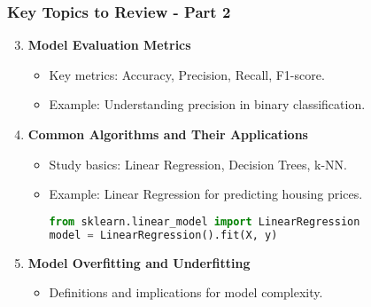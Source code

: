 \documentclass[aspectratio=169]{beamer}
\begin{document}
\begin{frame}[fragile]
    \frametitle{Key Topics to Review - Part 2}
    \begin{enumerate}
        \setcounter{enumi}{2} %
        \item \textbf{Model Evaluation Metrics}
        \begin{itemize}
            \item Key metrics: Accuracy, Precision, Recall, F1-score.
            \item Example: Understanding precision in binary classification.
        \end{itemize}

        \item \textbf{Common Algorithms and Their Applications}
        \begin{itemize}
            \item Study basics: Linear Regression, Decision Trees, k-NN.
            \item Example: Linear Regression for predicting housing prices.
            \begin{lstlisting}[language=Python]
from sklearn.linear_model import LinearRegression
model = LinearRegression().fit(X, y)
            \end{lstlisting}
        \end{itemize}

        \item \textbf{Model Overfitting and Underfitting}
        \begin{itemize}
            \item Definitions and implications for model complexity.
        \end{itemize}
    \end{enumerate}
\end{frame}
\end{document}
